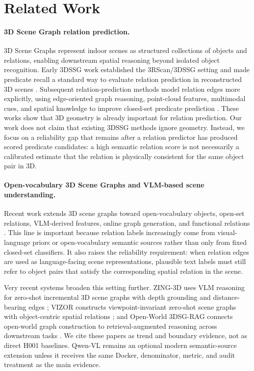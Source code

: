 \section{Related Work}

\paragraph{3D Scene Graph relation prediction.}
3D Scene Graphs represent indoor scenes as structured collections of objects
and relations, enabling downstream spatial reasoning beyond isolated object
recognition. Early 3DSSG work established the 3RScan/3DSSG setting and made
predicate recall a standard way to evaluate relation prediction in reconstructed
3D scenes \cite{wald2020learning3dssg}. Subsequent relation-prediction methods
model relation edges more explicitly, using edge-oriented graph reasoning,
point-cloud features, multimodal cues, and spatial knowledge to improve
closed-set predicate prediction
\cite{zhang2021sggpoint,feng2023smka,wang2023vlsat,koch2024sgrec3d}. These
works show that 3D geometry is already important for relation prediction. Our
work does not claim that existing 3DSSG methods ignore geometry. Instead, we
focus on a reliability gap that remains after a relation predictor has produced
scored predicate candidates: a high semantic relation score is not necessarily
a calibrated estimate that the relation is physically consistent for the same
object pair in 3D.

\paragraph{Open-vocabulary 3D Scene Graphs and VLM-based scene understanding.}
Recent work extends 3D scene graphs toward open-vocabulary objects, open-set
relations, VLM-derived features, online graph generation, and functional
relations
\cite{koch2024open3dsg,chen2024ccl3dsgg,hou2025fross,zhang2025openfungraph,wang2025octreegraph}.
This line is important because relation labels increasingly come from
visual-language priors or open-vocabulary semantic sources rather than only
from fixed closed-set classifiers. It also raises the reliability requirement:
when relation edges are used as language-facing scene representations,
plausible text labels must still refer to object pairs that satisfy the
corresponding spatial relation in the scene.

Very recent systems broaden this setting further. ZING-3D uses VLM reasoning
for zero-shot incremental 3D scene graphs with depth grounding and
distance-bearing edges \cite{saxena2025zing3d}; VIZOR constructs
viewpoint-invariant zero-shot scene graphs with object-centric spatial
relations \cite{madhavaram2026vizor}; and Open-World 3DSG-RAG connects
open-world graph construction to retrieval-augmented reasoning across
downstream tasks \cite{yu2025openworld3dsg}. We cite these papers as trend and
boundary evidence, not as direct H001 baselines. Qwen-VL remains an optional
modern semantic-source extension unless it receives the same Docker,
denominator, metric, and audit treatment as the main evidence.

